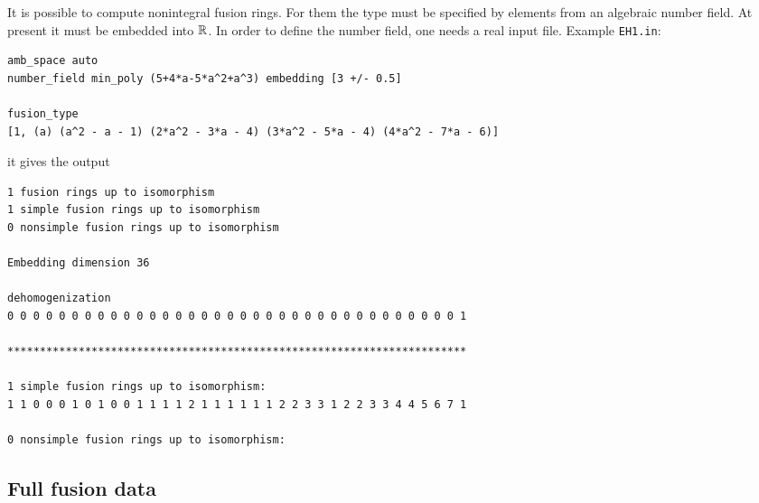 It is possible to compute nonintegral fusion rings. For them the type must be specified by elements from an algebraic number field. At present it must be embedded into ${\mathbb R}$. In order to define the number field, one needs a real input file. Example \verb*|EH1.in|:
\begin{Verbatim}
amb_space auto
number_field min_poly (5+4*a-5*a^2+a^3) embedding [3 +/- 0.5]

fusion_type
[1, (a) (a^2 - a - 1) (2*a^2 - 3*a - 4) (3*a^2 - 5*a - 4) (4*a^2 - 7*a - 6)]
\end{Verbatim}
it gives the output
\begin{Verbatim}
1 fusion rings up to isomorphism
1 simple fusion rings up to isomorphism
0 nonsimple fusion rings up to isomorphism

Embedding dimension 36

dehomogenization
0 0 0 0 0 0 0 0 0 0 0 0 0 0 0 0 0 0 0 0 0 0 0 0 0 0 0 0 0 0 0 0 0 0 0 1 

***********************************************************************

1 simple fusion rings up to isomorphism:
1 1 0 0 0 1 0 1 0 0 1 1 1 1 2 1 1 1 1 1 1 2 2 3 3 1 2 2 3 3 4 4 5 6 7 1

0 nonsimple fusion rings up to isomorphism:
\end{Verbatim}

\subsection{Full fusion data}

